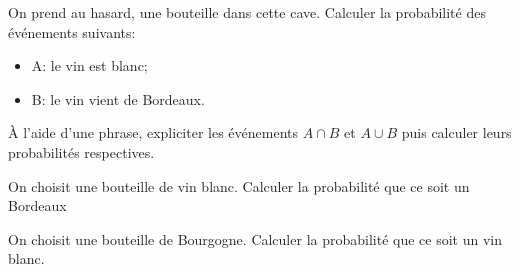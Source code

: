 \documentclass[a4paper,12pt]{scrartcl}
\begin{document}
\question{}
On prend au hasard, une bouteille dans cette cave. Calculer la probabilité des événements suivants:

\begin{itemize}
    \item A: \og{}le vin est blanc\fg{};
    \item B: \og{}le vin vient de Bordeaux\fg{}.
\end{itemize}

\question{}
À l'aide d'une phrase, expliciter les événements $A \cap B$ et $A \cup B$ puis calculer leurs probabilités respectives.

\question{}
On choisit une bouteille de vin blanc. Calculer la probabilité que ce soit un Bordeaux

\question{}
On choisit une bouteille de Bourgogne. Calculer la probabilité que ce soit un vin blanc.
\end{document}
